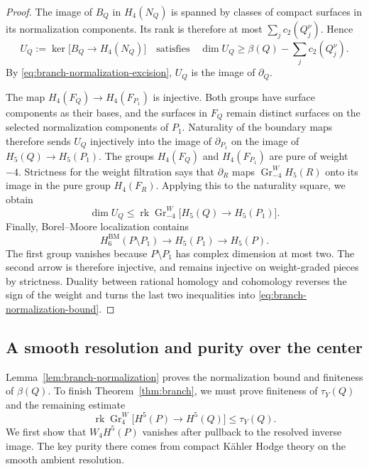 \documentclass[11pt]{amsart}
\theoremstyle{definition}
\theoremstyle{remark}
\numberwithin{equation}{section}
\DeclareMathOperator{\rk}{rk}
\DeclareMathOperator{\Gr}{Gr}
\newcommand{\BM}{\mathrm{BM}}
\begin{document}
\begin{proof}
The image of $B_Q$ in $H_4(N_Q)$ is spanned by classes of compact
surfaces in its normalization components.  Its rank is therefore at
most $\sum_jc_2(Q_j^\nu)$.  Hence
\[
 U_Q:=\ker\bigl[B_Q\longrightarrow H_4(N_Q)\bigr]
 \quad\text{satisfies}\quad
 \dim U_Q\geq\beta(Q)-\sum_jc_2(Q_j^\nu).
\]
By \eqref{eq:branch-normalization-excision}, $U_Q$ is the image of
$\partial_Q$.

The map $H_4(F_Q)\to H_4(F_{P_1})$ is injective.  Both groups have
surface components as their bases, and the surfaces in $F_Q$ remain
distinct surfaces on the selected normalization components of
$P_1$.  Naturality of the boundary maps therefore sends $U_Q$
injectively into the image of $\partial_{P_1}$ on the image of
$H_5(Q)\to H_5(P_1)$.  The groups $H_4(F_Q)$ and $H_4(F_{P_1})$
are pure of weight $-4$.  Strictness for the weight filtration
\cite[Theorem~2.3.5(iii)--(iv)]{DeligneHodgeII} says that
$\partial_R$ maps $\Gr^W_{-4}H_5(R)$ onto its image in the pure group
$H_4(F_R)$.  Applying this to the naturality square, we obtain
\[
 \dim U_Q\leq
 \rk\Gr^W_{-4}\bigl[H_5(Q)\longrightarrow H_5(P_1)\bigr].
\]
Finally, Borel--Moore localization contains
\[
 H^{\BM}_6(P\setminus P_1)\longrightarrow H_5(P_1)
                         \longrightarrow H_5(P).
\]
The first group vanishes because $P\setminus P_1$ has complex
dimension at most two.  The second arrow is therefore injective,
and remains injective on weight-graded pieces by strictness.  Duality
between rational homology and cohomology reverses the sign of the
weight and turns the last two inequalities into
\eqref{eq:branch-normalization-bound}.
\end{proof}

\subsection{A smooth resolution and purity over the center}

Lemma~\ref{lem:branch-normalization} proves the normalization bound
and finiteness of $\beta(Q)$.  To finish Theorem~\ref{thm:branch}, we
must prove finiteness of $\tau_Y(Q)$ and the remaining estimate
\[
 \rk\Gr^W_4\bigl[H^5(P)\longrightarrow H^5(Q)\bigr]\leq\tau_Y(Q).
\]
We first show that $W_4H^5(P)$ vanishes after pullback to the resolved
inverse image.  The key purity there comes from compact K\"ahler Hodge
theory on the smooth ambient resolution.
\end{document}
